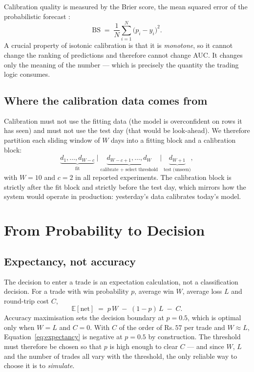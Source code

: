 \documentclass[11pt,a4paper]{article}
\newcommand{\rs}{Rs.\,}                 %
\begin{document}
Calibration quality is measured by the Brier score, the mean squared error of the
probabilistic forecast \cite{brier}:
\begin{equation}
\text{BS} \;=\; \frac{1}{N}\sum_{i=1}^{N}\big(p_i - y_i\big)^2 .
\end{equation}
A crucial property of isotonic calibration is that it is \emph{monotone}, so it cannot
change the ranking of predictions and therefore cannot change AUC. It changes only the
meaning of the number --- which is precisely the quantity the trading logic consumes.

\subsection{Where the calibration data comes from}

Calibration must not use the fitting data (the model is overconfident on rows it has
seen) and must not use the test day (that would be look-ahead). We therefore partition
each sliding window of $W$ days into a fitting block and a calibration block:
\begin{equation}
\underbrace{d_{1},\dots,d_{W-c}}_{\text{fit}} \;\Big|\;
\underbrace{d_{W-c+1},\dots,d_{W}}_{\text{calibrate + select threshold}} \;\Big|\;
\underbrace{d_{W+1}}_{\text{test (unseen)}} ,
\end{equation}
with $W=10$ and $c=2$ in all reported experiments. The calibration block is strictly
after the fit block and strictly before the test day, which mirrors how the system would
operate in production: yesterday's data calibrates today's model.

\section{From Probability to Decision}\label{sec:decision}

\subsection{Expectancy, not accuracy}

The decision to enter a trade is an expectation calculation, not a classification
decision. For a trade with win probability $p$, average win $W$, average loss $L$ and
round-trip cost $C$,
\begin{equation}
\mathbb{E}[\text{net}] \;=\; p\,W \;-\; (1-p)\,L \;-\; C .
\label{eq:expectancy}
\end{equation}
Accuracy maximisation sets the decision boundary at $p=0.5$, which is optimal only when
$W = L$ and $C = 0$. With $C$ of the order of \rs$57$ per trade and $W \approx L$,
Equation~\eqref{eq:expectancy} is negative at $p=0.5$ by construction. The threshold must
therefore be chosen so that $p$ is high enough to clear $C$ --- and since $W$, $L$ and
the number of trades all vary with the threshold, the only reliable way to choose it is
to \emph{simulate}.
\end{document}
